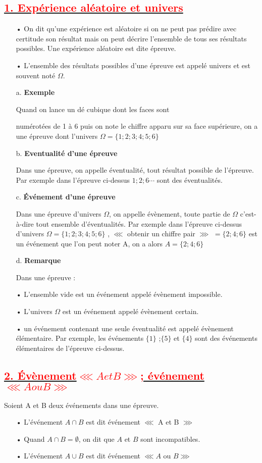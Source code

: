\documentclass[12pt]{article}
\begin{document}
\subsection*{\underline{\textbf{\textcolor{red}{1. Expérience aléatoire et univers}}}}
\begin{enumerate}
\item[•]On dit qu’une expérience est aléatoire si on ne peut pas prédire avec certitude son résultat mais on peut décrire l’ensemble de tous ses résultats possibles. Une expérience aléatoire est dite épreuve.
\item[•]L’ensemble des résultats possibles d’une épreuve est appelé univers et est souvent noté $\Omega$.
\item[a.] \textbf{Exemple}

Quand on lance un dé cubique dont les faces sont

numérotées de 1 à 6 puis on note le chiffre apparu 
sur sa face supérieure, on a une épreuve dont l’univers $\Omega = \lbrace 1; 2; 3; 4; 5; 6\rbrace$
\item[b.] \textbf{Eventualité d’une épreuve}

Dans une épreuve, on appelle éventualité, tout résultat possible de l’épreuve. Par exemple dans 
l’épreuve ci-dessus $1 ; 2 ; 6\cdots $ sont des éventualités.
\item[c.] \textbf{ Événement d’une épreuve}

Dans une épreuve d’univers $\Omega$, on appelle évènement, toute partie de $\Omega$ c’est-à-dire tout ensemble d’éventualités. Par exemple dans l’épreuve ci-dessus d’univers
$\Omega= \lbrace1; 2; 3; 4; 5; 6\rbrace $ , $\lll$ obtenir un chiffre 
pair $\ggg$ $= \lbrace2; 4; 6\rbrace $ est un événement que l’on peut noter A, on a alors 
$A = \lbrace 2; 4; 6\rbrace$

\item[d.] \textbf{Remarque}

Dans une épreuve :
\item[•] L’ensemble vide est un événement appelé évènement impossible.
\item[•] L’univers $\Omega$ est un événement appelé évènement certain.
\item[•] un événement contenant une seule éventualité est appelé évènement élémentaire. Par exemple, 
les événements $\lbrace 1\rbrace$ ;$\lbrace 5\rbrace$ et $\lbrace 4\rbrace$ sont des événements élémentaires de l’épreuve ci-dessus.
\end{enumerate}
\subsection*{\underline{\textbf{\textcolor{red}{2.  Évènement$ \lll A et B \ggg $; événement$ \lll A ou B \ggg $}}}}
Soient A et B deux événements dans une épreuve.
\begin{itemize}
\item[•] L’événement $A \cap B$ est dit événement $\lll$ A et B $\ggg$ 
\item[•] Quand $A \cap B = \emptyset$, on dit que $A$ et $B$ sont incompatibles.
\item[•] L’événement $A \cup B$ est dit événement $\lll A$ ou $B \ggg$
\end{itemize}
\end{document}
